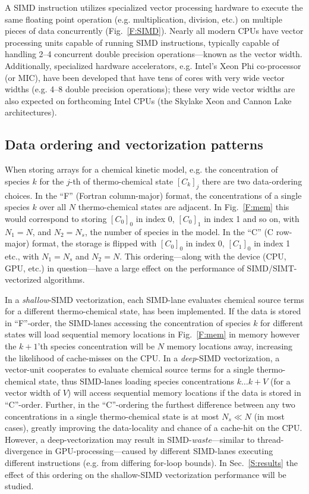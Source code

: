 \documentclass[12pt]{ussci}
\begin{document}
A SIMD instruction utilizes specialized vector processing hardware to execute the same floating point operation (e.g. multiplication, division, etc.) on multiple pieces of data concurrently (Fig.~\ref{F:SIMD}).
Nearly all modern CPUs have vector processing units capable of running SIMD instructions, typically capable of handling 2--4 concurrent double precision operations---known as the vector width.
Additionally, specialized hardware accelerators, e.g. Intel's Xeon Phi co-processor (or MIC), have been developed that have tens of cores with very wide vector widths (e.g. 4--8 double precision operations); these very wide vector widths are also expected on forthcoming Intel CPUs (the Skylake Xeon and Cannon Lake architectures).

\subsection{Data ordering and vectorization patterns}
\label{S:data}
When storing arrays for a chemical kinetic model, e.g. the concentration of species $k$ for the $j$-th of thermo-chemical state $[C_k]_j$ there are two data-ordering choices.
In the ``F'' (Fortran column-major) format, the concentrations of a single species $k$ over all $N$ thermo-chemical states are adjacent.
In Fig.~\ref{F:mem} this would correspond to storing $[C_0]_0$ in index \num{0}, $[C_0]_1$ in index \num{1} and so on, with $N_1 = N$, and $N_2 = N_s$, the number of species in the model.
In the ``C'' (C row-major) format, the storage is flipped with $[C_0]_0$ in index \num{0}, $[C_1]_0$ in index \num{1} etc., with $N_1 = N_s$ and $N_2 = N$.
This ordering---along with the device (CPU, GPU, etc.) in question---have a large effect on the performance of SIMD\slash SIMT-vectorized algorithms.

In a \textit{shallow}-SIMD vectorization, each SIMD-lane evaluates chemical source terms for a different thermo-chemical state, has been implemented.
If the data is stored in ``F''-order, the SIMD-lanes accessing the concentration of species $k$ for different states will load sequential memory locations in Fig.~\ref{F:mem} in memory however the $k+1$'th species concentration will be $N$ memory locations away, increasing the likelihood of cache-misses on the CPU.
In a \textit{deep}-SIMD vectorization, a vector-unit cooperates to evaluate chemical source terms for a single thermo-chemical state, thus SIMD-lanes loading species concentrations $k\dots k+V$ (for a vector width of $V$) will access sequential memory locations if the data is stored in ``C''-order.
Further, in the ``C''-ordering the furthest difference between any two concentrations in a single thermo-chemical state is at most $N_s \ll N$ (in most cases), greatly improving the data-locality and chance of a cache-hit on the CPU.
However, a deep-vectorization may result in SIMD-\textit{waste}---similar to thread-divergence in GPU-processing---caused by different SIMD-lanes executing different instructions (e.g. from differing for-loop bounds).
In Sec.~\ref{S:results} the effect of this ordering on the shallow-SIMD vectorization performance will be studied.
\end{document}
